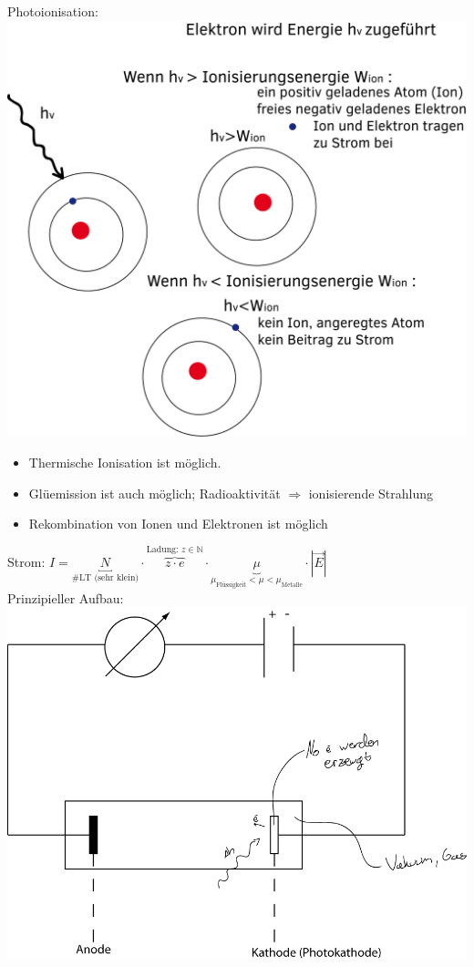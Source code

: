 \documentclass[11pt]{article}
\begin{document}
	\newpage \noindent Photoionisation: \\ \includegraphics[width=0.7\linewidth]{skizzen/15/VL07/5} \hfill \break
	\begin{itemize}
		\item Thermische Ionisation ist möglich.
		\item Glüemission ist auch möglich; Radioaktivität $  \Rightarrow $ ionisierende Strahlung
		\item Rekombination von Ionen und Elektronen ist möglich
	\end{itemize}
	Strom: $ \boxed{I = \underbracket{N}_{\text{\#LT (sehr klein)}} \cdot \overbrace{z \cdot e}^{\text{Ladung: }z \in \mathbb{N} } \cdot \underbrace{\mu}_{ \mu_{\text{Flüssigkeit}} <\mu<\mu_{\text{Metalle}} } \cdot |\vec{E}| } $ \\
	\newpage
	Prinzipieller Aufbau: \\
		\includegraphics[width=0.8\linewidth]{skizzen/15/VL07/VL7_3}
\end{document}
